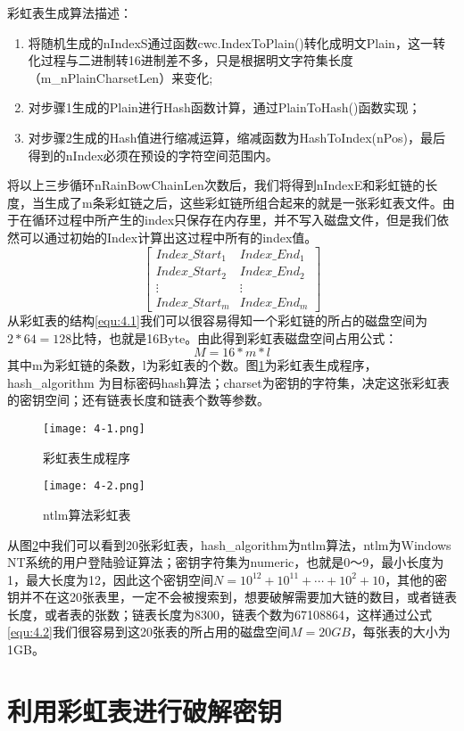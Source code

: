 彩虹表生成算法描述：
\begin{enumerate}
\item 将随机生成的nIndexS通过函数cwc.IndexToPlain()转化成明文Plain，这一转化过程与二进制转16进制差不多，只是根据明文字符集长度（m\_nPlainCharsetLen）来变化;
\item 对步骤1生成的Plain进行Hash函数计算，通过PlainToHash()函数实现；
\item 对步骤2生成的Hash值进行缩减运算，缩减函数为HashToIndex(nPos)，最后得到的nIndex必须在预设的字符空间范围内。
\end{enumerate}

将以上三步循环nRainBowChainLen次数后，我们将得到nIndexE和彩虹链的长度，当生成了m条彩虹链之后，这些彩虹链所组合起来的就是一张彩虹表文件。由于在循环过程中所产生的index只保存在内存里，并不写入磁盘文件，但是我们依然可以通过初始的Index计算出这过程中所有的index值。
\begin{equation}
\label{equ:4.1}
\begin{bmatrix}
Index\_Start_1 & Index\_End_1 \\
Index\_Start_2 & Index\_End_2 \\
\vdots  & \vdots \\
Index\_Start_m & Index\_End_m 
\end{bmatrix}
\end{equation}
从彩虹表的结构\eqref{equ:4.1}我们可以很容易得知一个彩虹链的所占的磁盘空间为$2*64=128$比特，也就是16Byte。由此得到彩虹表磁盘空间占用公式：
\begin{equation}
\label{equ:4.2}
M=16*m*l
\end{equation}
其中m为彩虹链的条数，l为彩虹表的个数。图\ref{fig:4.1}为彩虹表生成程序，hash\_algorithm 为目标密码hash算法；charset为密钥的字符集，决定这张彩虹表的密钥空间；还有链表长度和链表个数等参数。
\begin{figure}[!ht]
\centering
\texttt{[image: 4-1.png]}
\caption{彩虹表生成程序}
\label{fig:4.1}
\end{figure}

\begin{figure}[!ht]
\centering
\texttt{[image: 4-2.png]}
\caption{ntlm算法彩虹表}
\label{fig:4.2}
\end{figure}
从图\ref{fig:4.2}中我们可以看到20张彩虹表，hash\_algorithm为ntlm算法，ntlm为Windows NT系统的用户登陆验证算法；密钥字符集为numeric，也就是0～9，最小长度为1，最大长度为12，因此这个密钥空间$N=10^{12}+10^{11}+ \cdots +10^2 +10$，其他的密钥并不在这20张表里，一定不会被搜索到，想要破解需要加大链的数目，或者链表长度，或者表的张数；链表长度为8300，链表个数为67108864，这样通过公式\eqref{equ:4.2}我们很容易到这20张表的所占用的磁盘空间$M=20GB$，每张表的大小为1GB。
\section{利用彩虹表进行破解密钥}
